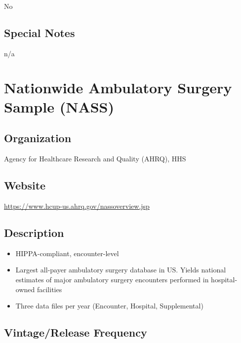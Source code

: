 \documentclass[
]{book}
\providecommand{\tightlist}{%
  \setlength{\itemsep}{0pt}\setlength{\parskip}{0pt}}
\begin{document}
No

\hypertarget{special-notes-68}{%
\section{Special Notes}\label{special-notes-68}}

n/a

\mainmatter

\hypertarget{nationwide-ambulatory-surgery-sample-nass}{%
\chapter{Nationwide Ambulatory Surgery Sample (NASS)}\label{nationwide-ambulatory-surgery-sample-nass}}

\hypertarget{organization-69}{%
\section{Organization}\label{organization-69}}

Agency for Healthcare Research and Quality (AHRQ), HHS

\hypertarget{website-69}{%
\section{Website}\label{website-69}}

\url{https://www.hcup-us.ahrq.gov/nassoverview.jsp}

\hypertarget{description-69}{%
\section{Description}\label{description-69}}

\begin{itemize}
\tightlist
\item
  HIPPA-compliant, encounter-level
\item
  Largest all-payer ambulatory surgery database in US. Yields national estimates of major ambulatory surgery encounters performed in hospital-owned facilities
\item
  Three data files per year (Encounter, Hospital, Supplemental)
\end{itemize}

\hypertarget{vintagerelease-frequency-69}{%
\section{Vintage/Release Frequency}\label{vintagerelease-frequency-69}}
\end{document}
